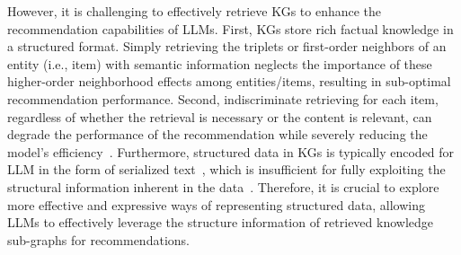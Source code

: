 However, it is challenging to effectively retrieve KGs to enhance the recommendation capabilities of LLMs.
First, KGs store rich factual knowledge in a structured format.
Simply retrieving the triplets or first-order neighbors of an entity (i.e., item) with semantic information neglects the importance of these higher-order neighborhood effects among entities/items, resulting in sub-optimal recommendation performance.
Second, indiscriminate retrieving for each item, regardless of whether the retrieval is necessary or the content is relevant, can degrade the performance of the recommendation while severely reducing the model's efficiency~\citep{asai2023self,labruna2024retrieve}.
Furthermore, structured data in KGs is typically encoded for LLM in the form of serialized text~\citep{wu2023retrieve,sun2023think}, which is insufficient for fully exploiting the structural information inherent in the data~\citep{perozzi2024let,fatemi2023talk}.
Therefore, it is crucial to explore more effective and expressive ways of representing structured data, allowing LLMs to effectively leverage the structure information of retrieved knowledge sub-graphs for recommendations. 


